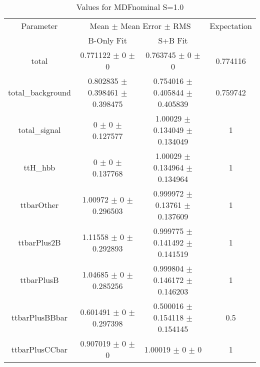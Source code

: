 \begin{table}
\centering
\caption{Values for MDFnominal S=1.0}
\begin{tabular}{cccc}
\toprule
Parameter & \multicolumn{2}{c}{Mean $\pm$ Mean Error $\pm$ RMS} & Expectation\\
 & B-Only Fit & S+B Fit & \\
\midrule
total & \num{0.771122} $\pm$ \num{0} $\pm$ \num{0} & \num{0.763745} $\pm$ \num{0} $\pm$ \num{0} & \num{0.774116}\\
total\_background & \num{0.802835} $\pm$ \num{0.398461} $\pm$ \num{0.398475} & \num{0.754016} $\pm$ \num{0.405844} $\pm$ \num{0.405839} & \num{0.759742}\\
total\_signal & \num{0} $\pm$ \num{0} $\pm$ \num{0.127577} & \num{1.00029} $\pm$ \num{0.134049} $\pm$ \num{0.134049} & \num{1}\\
ttH\_hbb & \num{0} $\pm$ \num{0} $\pm$ \num{0.137768} & \num{1.00029} $\pm$ \num{0.134964} $\pm$ \num{0.134964} & \num{1}\\
ttbarOther & \num{1.00972} $\pm$ \num{0} $\pm$ \num{0.296503} & \num{0.999972} $\pm$ \num{0.13761} $\pm$ \num{0.137609} & \num{1}\\
ttbarPlus2B & \num{1.11558} $\pm$ \num{0} $\pm$ \num{0.292893} & \num{0.999775} $\pm$ \num{0.141492} $\pm$ \num{0.141519} & \num{1}\\
ttbarPlusB & \num{1.04685} $\pm$ \num{0} $\pm$ \num{0.285256} & \num{0.999804} $\pm$ \num{0.146172} $\pm$ \num{0.146203} & \num{1}\\
ttbarPlusBBbar & \num{0.601491} $\pm$ \num{0} $\pm$ \num{0.297398} & \num{0.500016} $\pm$ \num{0.154118} $\pm$ \num{0.154145} & \num{0.5}\\
ttbarPlusCCbar & \num{0.907019} $\pm$ \num{0} $\pm$ \num{0} & \num{1.00019} $\pm$ \num{0} $\pm$ \num{0} & \num{1}\\
\bottomrule
\end{tabular}
\end{table}